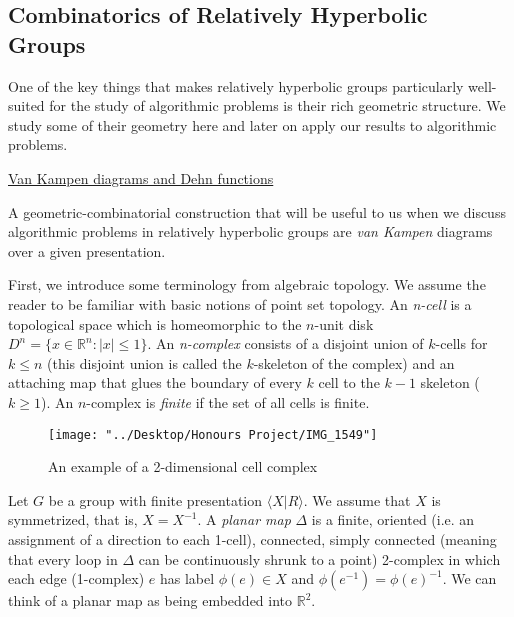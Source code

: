 \documentclass[12pt]{article}
\newcommand{\vs}{\vskip10pt}
\begin{document}
	\vs 

\newpage
	\subsection{Combinatorics of Relatively Hyperbolic Groups}
	
	One of the key things that makes relatively hyperbolic groups particularly well-suited for the study of algorithmic problems is their rich geometric structure. We study some of their geometry here and later on apply our results to algorithmic problems. 
	
	\vs 
	
	\underline{Van Kampen diagrams and Dehn functions}
	
	\vs 
	
	A geometric-combinatorial construction that will be useful to us when we discuss algorithmic problems in relatively hyperbolic groups are \textit{van Kampen} diagrams over a given presentation. 
	
	\vs 
	
	First, we introduce some terminology from algebraic topology. We assume the reader to be familiar with basic notions of point set topology. An \textit{n-cell} is a topological space which is homeomorphic to the $n$-unit disk $D^n = \{x \in \mathbb{R}^{n}: \vert x \vert \leq 1\}$. An \textit{n-complex} consists of a disjoint union of $k$-cells for $k \leq n$ (this disjoint union is called the $k$-skeleton of the complex) and an attaching map that glues the boundary of every $k$ cell to the $k-1$ skeleton ($k \geq 1$). An $n$-complex is \textit{finite} if the set of all cells is finite. 
	
\begin{figure} [H]
	\centering
	\texttt{[image: "../Desktop/Honours Project/IMG\_1549"]}
	\caption{An example of a 2-dimensional cell complex}
	\label{fig:img1549}
\end{figure}
	
	\vs 
	
	Let $G$ be a group with finite presentation $\langle X \vert R \rangle$. We assume that $X$ is symmetrized, that is, $X = X^{-1}$. A \textit{planar map} $\Delta$ is a finite, oriented (i.e. an assignment of a direction to each 1-cell), connected, simply connected (meaning that every loop in $\Delta$ can be continuously shrunk to a point) 2-complex in which each edge (1-complex) $e$ has label $\phi(e) \in X$ and $\phi(e^{-1}) = \phi(e)^{-1}$. We can think of a planar map as being embedded into $\mathbb{R}^2$. 
	
\end{document}
